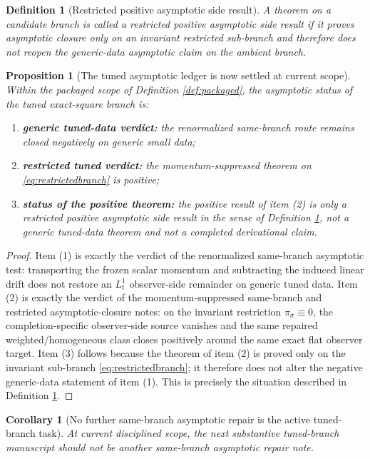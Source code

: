 \documentclass[11pt]{article}
\newtheorem{definition}{Definition}
\newtheorem{proposition}{Proposition}
\newtheorem{corollary}{Corollary}
\begin{document}
\begin{definition}[Restricted positive asymptotic side result]
\label{def:side}
A theorem on a candidate branch is called a \emph{restricted positive asymptotic side result} if it proves asymptotic closure only on an invariant restricted sub-branch and therefore does not reopen the generic-data asymptotic claim on the ambient branch.
\end{definition}

\begin{proposition}[The tuned asymptotic ledger is now settled at current scope]
\label{prop:ledger}
Within the packaged scope of Definition \ref{def:packaged}, the asymptotic status of the tuned exact-square branch is:
\begin{enumerate}
    \item \textbf{generic tuned-data verdict:} the renormalized same-branch route remains closed negatively on generic small data;
    \item \textbf{restricted tuned verdict:} the momentum-suppressed theorem on \eqref{eq:restrictedbranch} is positive;
    \item \textbf{status of the positive theorem:} the positive result of item (2) is only a restricted positive asymptotic side result in the sense of Definition \ref{def:side}, not a generic tuned-data theorem and not a completed derivational claim.
\end{enumerate}
\end{proposition}

\begin{proof}
Item (1) is exactly the verdict of the renormalized same-branch asymptotic test: transporting the frozen scalar momentum and subtracting the induced linear drift does not restore an \(L_t^1\) observer-side remainder on generic tuned data. Item (2) is exactly the verdict of the momentum-suppressed same-branch and restricted asymptotic-closure notes: on the invariant restriction \(\pi_\sigma\equiv 0\), the completion-specific observer-side source vanishes and the same repaired weighted/homogeneous class closes positively around the same exact flat observer target. Item (3) follows because the theorem of item (2) is proved only on the invariant sub-branch \eqref{eq:restrictedbranch}; it therefore does not alter the negative generic-data statement of item (1). This is precisely the situation described in Definition \ref{def:side}.
\end{proof}

\begin{corollary}[No further same-branch asymptotic repair is the active tuned-branch task]
\label{cor:noasymp}
At current disciplined scope, the next substantive tuned-branch manuscript should not be another same-branch asymptotic repair note.
\end{corollary}
\end{document}
